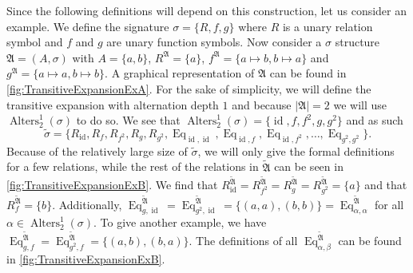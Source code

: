 Since the following definitions will depend on this construction, let us consider an example.
We define the signature $\sigma=\{R,f,g\}$ where $R$ is a unary relation symbol and $f$ and $g$ are unary function symbols.
Now consider a $\sigma$ structure $\mathfrak A=(A,\sigma)$ with $A=\{a,b\}$, $R^{\mathfrak A}=\{a\}$, $f^{\mathfrak A}=\{a\mapsto b, b\mapsto a\}$ and $g^{\mathfrak A}=\{a\mapsto a, b\mapsto b\}$.
A graphical representation of $\mathfrak A$ can be found in \cref{fig:TransitiveExpansionExA}.
For the sake of simplicity, we will define the transitive expansion with alternation depth $1$ and because $\vert\mathfrak A\vert=2$ we will use $\operatorname{Alters}^1_2(\sigma)$ to do so.
We see that $\operatorname{Alters}^1_2(\sigma)=\{\operatorname{id}, f,f^2,g,g^2\}$ and as such 
$$\widetilde{\sigma}=\{R_{\operatorname{id}}, R_{f}, R_{f^2}, R_g, R_{g^2}, \operatorname{Eq}_{\operatorname{id},\operatorname{id}}, \operatorname{Eq}_{\operatorname{id},f}, \operatorname{Eq}_{\operatorname{id}, f^2}, \dots, \operatorname{Eq}_{g^2, g^2}\}.$$
Because of the relatively large size of $\widetilde{\sigma}$, we will only give the formal definitions for a few relations, while the rest of the relations in $\widetilde{\mathfrak A}$ can be seen in \cref{fig:TransitiveExpansionExB}.
We find that $R^{\widetilde{\mathfrak A}}_{\operatorname{id}}=R^{\widetilde{\mathfrak A}}_{f^2}=R^{\widetilde{\mathfrak A}}_g=R^{\widetilde{\mathfrak A}}_{g^2}=\{a\}$ and that $R^{\widetilde{\mathfrak A}}_f=\{b\}$.
Additionally, $\operatorname{Eq}^{\widetilde{\mathfrak A}}_{g,\operatorname{id}}=\operatorname{Eq}^{\widetilde{\mathfrak A}}_{g^2,\operatorname{id}}=\{(a,a),(b,b)\}=\operatorname{Eq}^{\widetilde{\mathfrak A}}_{\alpha,\alpha}$ for all $\alpha\in\operatorname{Alters}^1_2(\sigma)$.
To give another example, we have $\operatorname{Eq}^{\widetilde{\mathfrak A}}_{g,f}=\operatorname{Eq}^{\widetilde{\mathfrak A}}_{g^2,f}=\{(a,b),(b,a)\}$.
The definitions of all $\operatorname{Eq}^{\widetilde{\mathfrak A}}_{\alpha,\beta}$ can be found in \cref{fig:TransitiveExpansionExB}.

